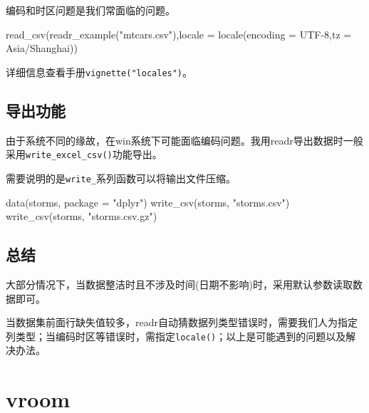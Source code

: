 \documentclass[
]{book}
\newenvironment{Shaded}{\begin{snugshade}}{\end{snugshade}}
\newcommand{\AttributeTok}[1]{\textcolor[rgb]{0.77,0.63,0.00}{#1}}
\newcommand{\FunctionTok}[1]{\textcolor[rgb]{0.00,0.00,0.00}{#1}}
\newcommand{\NormalTok}[1]{#1}
\newcommand{\StringTok}[1]{\textcolor[rgb]{0.31,0.60,0.02}{#1}}
\begin{document}
编码和时区问题是我们常面临的问题。

\begin{Shaded}
\begin{Highlighting}[]
\FunctionTok{read\_csv}\NormalTok{(}\FunctionTok{readr\_example}\NormalTok{(}\StringTok{"mtcars.csv"}\NormalTok{),}\AttributeTok{locale =} \FunctionTok{locale}\NormalTok{(}\AttributeTok{encoding =} \StringTok{\textquotesingle{}UTF{-}8\textquotesingle{}}\NormalTok{,}\AttributeTok{tz =} \StringTok{\textquotesingle{}Asia/Shanghai\textquotesingle{}}\NormalTok{))}
\end{Highlighting}
\end{Shaded}

详细信息查看手册\texttt{vignette("locales")}。

\hypertarget{ux5bfcux51faux529fux80fd}{%
\subsection{导出功能}\label{ux5bfcux51faux529fux80fd}}

由于系统不同的缘故，在win系统下可能面临编码问题。我用readr导出数据时一般采用\texttt{write\_excel\_csv()}功能导出。

需要说明的是\texttt{write\_}系列函数可以将输出文件压缩。

\begin{Shaded}
\begin{Highlighting}[]
\FunctionTok{data}\NormalTok{(storms, }\AttributeTok{package =} \StringTok{"dplyr"}\NormalTok{)}
\FunctionTok{write\_csv}\NormalTok{(storms, }\StringTok{"storms.csv"}\NormalTok{)}
\FunctionTok{write\_csv}\NormalTok{(storms, }\StringTok{"storms.csv.gz"}\NormalTok{)}
\end{Highlighting}
\end{Shaded}

\hypertarget{ux603bux7ed3-1}{%
\subsection{总结}\label{ux603bux7ed3-1}}

大部分情况下，当数据整洁时且不涉及时间(日期不影响)时，采用默认参数读取数据即可。

当数据集前面行缺失值较多，readr自动猜数据列类型错误时，需要我们人为指定列类型；当编码时区等错误时，需指定\texttt{locale()}；以上是可能遇到的问题以及解决办法。

\hypertarget{data:vroom}{%
\section{vroom}\label{data:vroom}}
\end{document}

